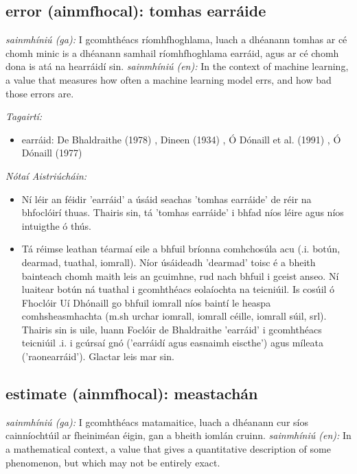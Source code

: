 \documentclass{article}
\begin{document}
\subsection*{error (ainmfhocal): tomhas earráide} 
 \noindent \textit{sainmhíniú (ga):} I gcomhthéacs ríomhfhoghlama, luach a dhéanann tomhas ar cé chomh minic is a dhéanann samhail ríomhfhoghlama earráid, agus ar cé chomh dona is atá na hearráidí sin.
\newline\newline
 \noindent \textit{sainmhíniú (en):} In the context of machine learning, a value that measures how often a machine learning model errs, and how bad those errors are.
\newline

 \noindent \textit{Tagairtí:}
\begin{itemize}
	\item earráid: De Bhaldraithe (1978) \cite{de-bhaldraithe}, Dineen (1934) \cite{dineen}, Ó Dónaill et al. (1991) \cite{focloir-beag}, Ó Dónaill (1977) \cite{odonaill}
\end{itemize}

 \noindent \textit{Nótaí Aistriúcháin:}
\begin{itemize}
	\item Ní léir an féidir 'earráid' a úsáid seachas 'tomhas earráide' de réir na bhfoclóirí thuas. Thairis sin, tá 'tomhas earráide' i bhfad níos léire agus níos intuigthe ó thús.
	\item Tá réimse leathan téarmaí eile a bhfuil bríonna comhchosúla acu (.i. botún, dearmad, tuathal, iomrall). Níor úsáideadh 'dearmad' toisc é a bheith bainteach chomh maith leis an gcuimhne, rud nach bhfuil i gceist anseo. Ní luaitear botún ná tuathal i gcomhthéacs eolaíochta na teicniúil. Is cosúil ó Fhoclóir Uí Dhónaill go bhfuil iomrall níos baintí le  heaspa comhsheasmhachta (m.sh urchar iomrall, iomrall céille, iomrall súil, srl). Thairis sin is uile, luann Foclóir de Bhaldraithe 'earráid' i gcomhthéacs teicniúil .i. i gcúrsaí gnó ('earráidí agus easnaimh eiscthe') agus míleata ('raonearráid'). Glactar leis mar sin.
\end{itemize}


\subsection*{estimate (ainmfhocal): meastachán} 
 \noindent \textit{sainmhíniú (ga):} I gcomhthéacs matamaitice, luach a dhéanann cur síos cainníochtúil ar fheiniméan éigin, gan a bheith iomlán cruinn.
\newline\newline
 \noindent \textit{sainmhíniú (en):} In a mathematical context, a value that gives a quantitative description of some phenomenon, but which may not be entirely exact.
\newline
\end{document}
